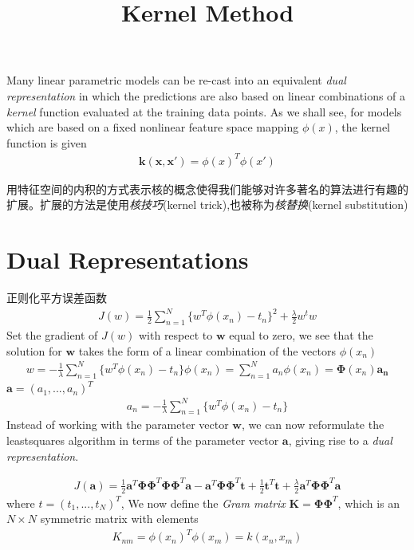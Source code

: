 \documentclass[a4paper]{article}
\begin{document}
\title{Kernel Method}
\author{}
\maketitle

Many linear parametric models can be re-cast into an equivalent \emph{dual representation} in which the predictions are also based on linear combinations of a \emph{kernel} function evaluated at the training data points. As we shall see, for models which are based on a fixed nonlinear feature space mapping $\phi(x)$, the kernel function is given
\begin{align}
\mathbf{k}(\mathbf{x}, \mathbf{x'}) = \phi(x)^T\phi(x')
\end{align}

用特征空间的内积的方式表示核的概念使得我们能够对许多著名的算法进行有趣的扩展。扩展的方法是使用\emph{核技巧}(kernel trick),也被称为\emph{核替换}(kernel substitution)

\section{Dual Representations}
正则化平方误差函数
\begin{align}
J(w) = \frac{1}{2} \sum_{n=1}^{N} \{ w^T\phi(x_n) -t_n \}^2 + \frac{\lambda}{2}w^tw
\end{align}
Set the gradient of $J(w)$ with respect to $\mathbf{w}$ equal to zero, we see that the solution for $\mathbf{w}$ takes the form of a linear combination of the vectors $\phi(x_n)$
\begin{align}
w = -\frac{1}{\lambda} \sum_{n=1}^{N} \{ w^T\phi(x_n) -t_n \}\phi(x_n)
  = \sum_{n=1}^Na_n\phi(x_n) = \mathbf{\Phi}(x_n)\mathbf{a_n}
\end{align}
$\mathbf{a} = (a_1,...,a_n)^T$
\begin{align}
a_n = -\frac{1}{\lambda} \sum_{n=1}^{N} \{ w^T\phi(x_n) -t_n \}
\end{align}
Instead of working with the parameter vector $\mathbf{w}$, we can now reformulate the leastsquares algorithm in terms of the parameter vector $\mathbf{a}$, giving rise to a \textit{dual representation}.

\begin{align}
J(\mathbf{a}) = \frac{1}{2} \mathbf{a}^T \mathbf{\Phi} \mathbf{\Phi}^T
  \mathbf{\Phi} \mathbf{\Phi}^T \mathbf{a} - \mathbf{a}^T
  \mathbf{\Phi} \mathbf{\Phi}^T \mathbf{t} + \frac{1}{2} \mathbf{t}^T
  \mathbf{t} + \frac{\lambda}{2} \mathbf{a}^T \mathbf{\Phi}
  \mathbf{\Phi}^T \mathbf{a}
\end{align}
where $t = (t_1,...,t_N)^T$, We now define the \textit{Gram matrix} $\mathbf{K} = \mathbf{\Phi} \mathbf{\Phi}^T$, which is an $N \times N$ symmetric matrix with elements
\begin{align}
\mathit{K}_{nm} = \phi(x_n)^T\phi(x_m) = k(x_n, x_m)
\end{align}
\end{document}
